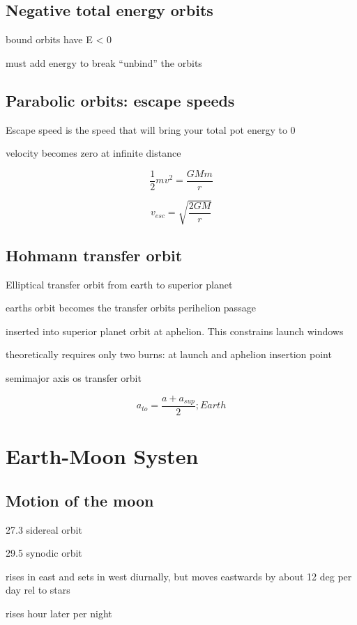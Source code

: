 \documentclass{article}
\begin{document}
\subsection{Negative total energy orbits}
\begin{list}{-}{}
\item bound orbits have E < 0
\item must add energy to break ``unbind'' the orbits
\end{list}

\subsection{Parabolic orbits: escape speeds}
\begin{list}{-}{}
\item Escape speed is the speed that will bring your total pot energy to 0
\item velocity becomes zero at infinite distance
\item \[\frac{1}{2}mv^2 = \frac{GMm}{r}\]
\item \[v_{esc} = \sqrt{\frac{2GM}{r}}\]
\end{list}


\subsection{Hohmann transfer orbit}
\begin{list}{-}{}
\item Elliptical transfer orbit from earth to superior planet
 \begin{list}{-}{}
\item earths orbit becomes the transfer orbits perihelion passage
\item inserted into superior planet orbit at aphelion. This constrains launch windows
\item theoretically requires only two burns: at launch and aphelion insertion point
\end{list}
\item semimajor axis os transfer orbit 
\item \[a_{to} = \frac{a + a_{sup}}{2}; Earth\]
\end{list}

\section{Earth-Moon Systen}
\subsection{Motion of the moon}
\begin{list}{-}{}
\item 27.3 sidereal orbit
\item 29.5 synodic orbit
\item rises in east and sets in west diurnally, but moves eastwards by about 12 deg per day rel to stars
\item rises hour later per night
\end{list}
\end{document}
